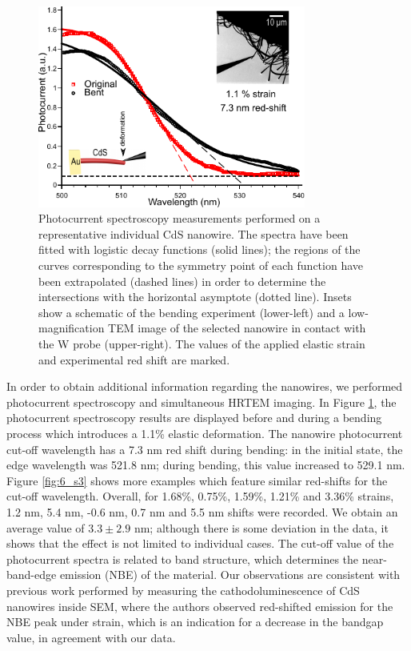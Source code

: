 \begin{figure}  
\includegraphics[width=250pt]{figures/figure6_4}
\caption[Photocurrent spectroscopy of deformed CdS NW]
{Photocurrent spectroscopy measurements performed on a representative individual CdS nanowire. The spectra have been fitted with logistic decay functions (solid lines); the regions of the curves corresponding to the symmetry point of each function have been extrapolated (dashed lines) in order to determine the intersections with the horizontal asymptote (dotted line). Insets show a schematic of the bending experiment (lower-left) and a low-magnification TEM image of the selected nanowire in contact with the W probe (upper-right). The values of the applied elastic strain and experimental red shift are marked.
\label{fig:6_4}}
\end{figure}

In order to obtain additional information regarding the nanowires, we performed photocurrent spectroscopy and simultaneous HRTEM imaging. In Figure \ref{fig:6_4}, the photocurrent spectroscopy results are displayed before and during a bending process which introduces a 1.1\% elastic deformation. The nanowire photocurrent cut-off wavelength has a 7.3 nm red shift during bending: in the initial state, the edge wavelength was 521.8 nm; during bending, this value increased to 529.1 nm. Figure \ref{fig:6_s3} shows more examples which feature similar red-shifts for the cut-off wavelength. Overall, for 1.68\%, 0.75\%, 1.59\%, 1.21\% and 3.36\% strains, 1.2 nm, 5.4 nm, -0.6 nm, 0.7 nm and 5.5 nm shifts were recorded. We obtain an average value of $3.3\pm2.9$ nm; although there is some deviation in the data, it shows that the effect is not limited to individual cases. The cut-off value of the photocurrent spectra is related to band structure, which determines the near-band-edge emission (NBE) of the material. Our observations are consistent with previous work performed by measuring the cathodoluminescence of CdS nanowires inside SEM, where the authors observed red-shifted emission for the NBE peak under strain, which is an indication for a decrease in the bandgap value, in agreement with our data.\cite{Fu2011}

